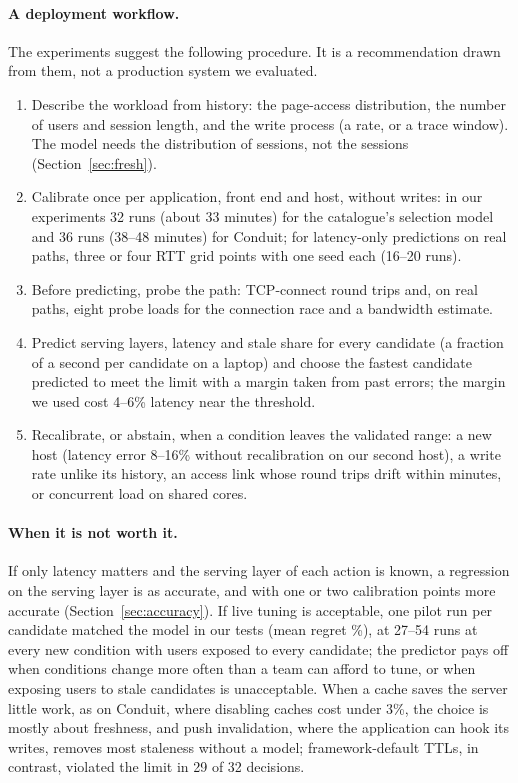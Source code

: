 \documentclass[acmsmall,review,nonacm]{acmart}
\begin{document}
\paragraph{A deployment workflow.}
The experiments suggest the following procedure. It is a recommendation drawn from them, not a production system we evaluated.
\begin{enumerate}
\item Describe the workload from history: the page-access distribution, the number of users and session length, and the write process (a rate, or a trace window). The model needs the distribution of sessions, not the sessions (Section~\ref{sec:fresh}).
\item Calibrate once per application, front end and host, without writes: in our experiments 32 runs (about 33 minutes) for the catalogue's selection model and 36 runs (38--48 minutes) for Conduit; for latency-only predictions on real paths, three or four RTT grid points with one seed each (16--20 runs).
\item Before predicting, probe the path: TCP-connect round trips and, on real paths, eight probe loads for the connection race and a bandwidth estimate.
\item Predict serving layers, latency and stale share for every candidate (a fraction of a second per candidate on a laptop) and choose the fastest candidate predicted to meet the limit with a margin taken from past errors; the margin we used cost 4--6\% latency near the threshold.
\item Recalibrate, or abstain, when a condition leaves the validated range: a new host (latency error 8--16\% without recalibration on our second host), a write rate unlike its history, an access link whose round trips drift within minutes, or concurrent load on shared cores.
\end{enumerate}

\paragraph{When it is not worth it.}
If only latency matters and the serving layer of each action is known, a regression on the serving layer is as accurate, and with one or two calibration points more accurate (Section~\ref{sec:accuracy}). If live tuning is acceptable, one pilot run per candidate matched the model in our tests (mean regret \decCatTuningMean\%), at 27--54 runs at every new condition with users exposed to every candidate; the predictor pays off when conditions change more often than a team can afford to tune, or when exposing users to stale candidates is unacceptable. When a cache saves the server little work, as on Conduit, where disabling caches cost under 3\%, the choice is mostly about freshness, and push invalidation, where the application can hook its writes, removes most staleness without a model; framework-default TTLs, in contrast, violated the limit in 29 of 32 decisions.
\end{document}
